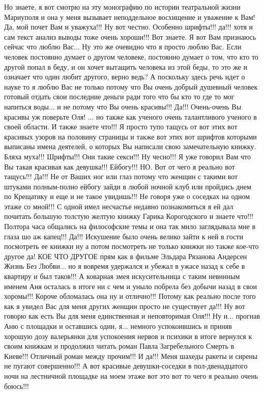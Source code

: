 Но знаете, я вот смотрю на эту монографию по истории театральной жизни
Мариуполя и она у меня вызывает неподдельное восхищение и уважение к Вам! Да,
мой почет Вам и уважуха!!!  Ну вот честно.  Особенно шрифты!!! да!!! хотя и сам
текст анализ выводы тоже очень хороши!!! Вот знаете.  Я вот Вам признаюсь
сейчас что люблю Вас... Ну это же очевидно что я просто люблю Вас.  Если
человек постоянно думает о другом человеке, постоянно думает о том, что кто то
другой попал в беду, и он хочет вытащить человека из этой беды, то это же и
означает что один любит другого, верно ведь? А поскольку здесь речь идет о
науке то я люблю Вас не только потому что Вы очень добрый душевный человек
готовый отдать свои последние деньги ради того что бы кто то где то мог напиться воды...
и не потому что Вы очень красивы!!! Да!!! Очень-очень Вы красивы уж поверьте Оля!
... но также как ученого очень талантливого ученого в своей
области. И также знаете что!!! Я просто тупо тащусь от вот этих вот красивых
узоров на половину страницы и также вот этих вот шрифтов которыми выписаны
имена деятелей, о которых Вы написали свою замечательную книжку. Бляха муха!!!
Шрифты!!! Они такие секси!!! Ну чесно!!!  Я уже говорил Вам что Вы такая
красивая как девушка!!! Ейбогу!!! НО.  Вот от чего я реально вот тащусь!!!
Да!!! Не от Ваших ног или глаз потому что женщин с такими вот штуками
полным-полно ейбогу зайди в любой ночной клуб или пройдись днем по Крещатику и
еще и не такое увидишь!!! Не говоря уже о соседках на одном этаже со мной!!! С
одной имел несчастье недавно познакомиться я ей дал почитать большую толстую
желтую книжку Гарика Корогодского и знаете что!!! Полтора часа общались на
философские темы и она так мило заглядывала мне в глаза шо аж капец!!! Да!!!
Искушение было очень велико зайти к ней в гости посмотреть ее книжки ну а потом
посмотреть не только книжки но также кое-что другое да! КОЕ ЧТО ДРУГОЕ прям как
в фильме Эльдара Рязанова Андерсен Жизнь Без Любви... но я вовремя удержался и
убежал в ужасе назад к себе в квартиру и был таков!!!  А коварная змея
искусительница с таким невинным именем Аня осталась в итоге ни с чем и уныло
побрела без добычи назад в свои хоромы!!!  Короче обломалась она ну и
отлично!!! Потому как реально после того как я увидел Вас для меня других
женщин просто не существует да!!! Ну вот говорю как есть Вы для меня
единственная и неповторимая Оля!!!  Ну и... прогнав Аню с площадки и оставшись
один, я... немного успокоившись и приняв хорошую дозу валерьянки для успокоения
нервов и психики в итоге вернулся к своим книжкам и продолжил читать роман
Павла Загребельного Смерть в Киеве!!! Отличный роман между прочим!!! И да!!!
Меня шахеды ракеты и сирены не пугают совершенно!!! А вот красивые
девушки-соседки в пол-двенадцатого ночи на лестничной площадке на моем этаже
вот это вот то чего я реально очень боюсь!!!


